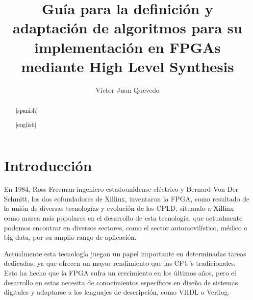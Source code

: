 \documentclass[11pt,spanish,listoffigures,listoftables]{tfgetsinf}
\title{Guía para la definición y adaptación de algoritmos para su implementación 
en FPGAs mediante High Level Synthesis}
\author{Víctor Juan Quevedo}
\begin{document}

\begin{abstract}

\end{abstract}

\begin{abstract}[spanish]

\end{abstract}

\begin{abstract}[english]

\end{abstract}


\mainmatter


\chapter{Introducci\'on}

   En 1984, Ross Freeman ingeniero estadounidense el\'ectrico y Bernard Von Der
   Schmitt, los dos cofundadores de Xillinx, inventaron la FPGA, como resultado
   de la uni\'on de diversas tecnologías y evolución de los CPLD, situando a
   Xillinx como marca m\'as populares en el desarrollo de esta tecnología, que
   actualmente podemos encontrar en diversos sectores, como el sector
   automovilístico, médico o big data, por su amplio rango de aplicaci\'on.    
   
   Actualmente esta tecnología juegan un papel importante en determinadas tareas
   dedicadas, ya que ofrecen un mayor rendimiento que las CPU's tradicionales.
   Esto ha hecho que la FPGA sufra un crecimiento en los últimos a\~{n}os, pero
   el desarrollo en estas necesita de conocimientos específicos en dise\~{n}o de
   sistemas digitales y adaptarse a los lenguajes de descripción, como VHDL o
   Verilog.
\end{document}
